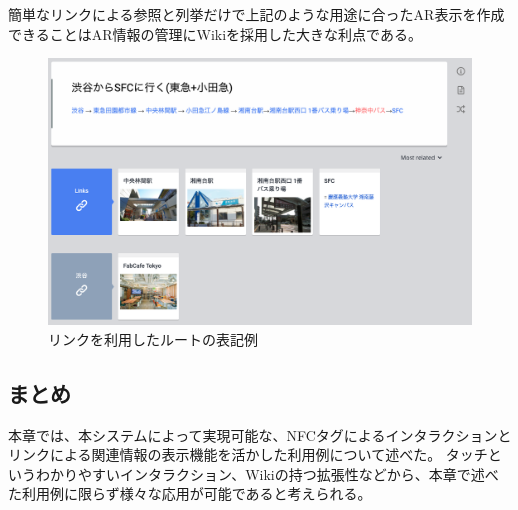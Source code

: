 簡単なリンクによる参照と列挙だけで上記のような用途に合ったAR表示を作成できることはAR情報の管理にWikiを採用した大きな利点である。


\begin{figure}[h]
  \centering
  \includegraphics[width=150mm]{images/route_scrapbox.png}
  \caption{リンクを利用したルートの表記例} \label{fig:route_scrapbox}
\end{figure}


\subsection{まとめ}
本章では、本システムによって実現可能な、NFCタグによるインタラクションとリンクによる関連情報の表示機能を活かした利用例について述べた。
タッチというわかりやすいインタラクション、Wikiの持つ拡張性などから、本章で述べた利用例に限らず様々な応用が可能であると考えられる。